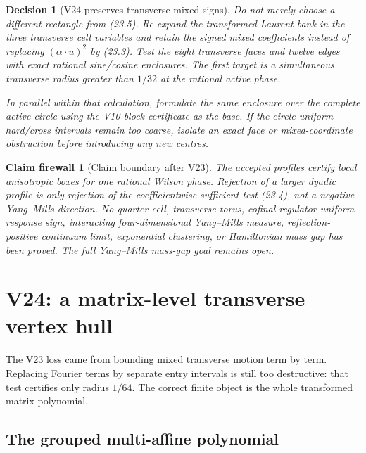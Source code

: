 \documentclass[11pt,oneside]{article}
\newtheorem{firewall}[theorem]{Claim firewall}
\newtheorem{decision}[theorem]{Decision}
\theoremstyle{definition}
\theoremstyle{remark}
\begin{document}
\begin{decision}[V24 preserves transverse mixed signs]
\label{dec:newv23-next}
Do not merely choose a different rectangle from (23.5).  Re-expand
the transformed Laurent bank in the three transverse cell variables
and retain the signed mixed coefficients instead of replacing
\((\alpha\cdot u)^2\) by (23.3).  Test the eight transverse faces
and twelve edges with exact rational sine/cosine enclosures.  The
first target is a simultaneous transverse radius greater than
\(1/32\) at the rational active phase.

In parallel within that calculation, formulate the same enclosure
over the complete active circle using the V10 block certificate as
the base.  If the circle-uniform hard/cross intervals remain too
coarse, isolate an exact face or mixed-coordinate obstruction before
introducing any new centres.
\end{decision}

\begin{firewall}[Claim boundary after V23]
\label{fire:newv23-final}
The accepted profiles certify local anisotropic boxes for one
rational Wilson phase.  Rejection of a larger dyadic profile is only
rejection of the coefficientwise sufficient test (23.4), not a
negative Yang--Mills direction.  No quarter cell, transverse torus,
cofinal regulator-uniform response sign, interacting
four-dimensional Yang--Mills measure, reflection-positive continuum
limit, exponential clustering, or Hamiltonian mass gap has been
proved.  The full Yang--Mills mass-gap goal remains open.
\end{firewall}

\section{V24: a matrix-level transverse vertex hull}
\label{sec:newv24-vertex-hull}

The V23 loss came from bounding mixed transverse motion term by
term.  Replacing Fourier terms by separate entry intervals is still
too destructive: that test certifies only radius \(1/64\).  The
correct finite object is the whole transformed matrix polynomial.

\subsection{The grouped multi-affine polynomial}
\end{document}
